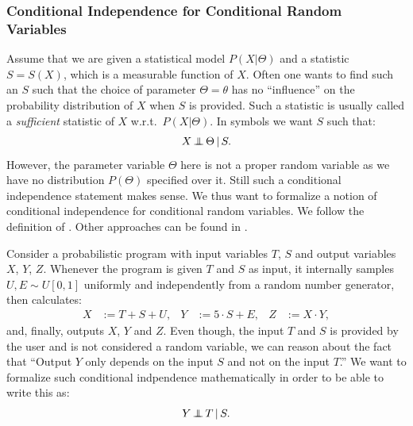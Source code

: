 \subsubsection{Conditional Independence for Conditional Random Variables}

\begin{Motivation}
    Assume that we are given a statistical model $P(X|\Theta)$ and a statistic $S=S(X)$, which is a measurable function of $X$.
    Often one wants to find such an $S$ such that the choice of parameter $\Theta=\theta$ has no ``influence'' on the probability distribution of $X$ when $S$ is provided. Such a statistic is usually called a \emph{sufficient} statistic of $X$ w.r.t.\ $P(X|\Theta)$. In symbols we want $S$ such that:
    \[ X \operatorname*{\perp\mkern-11mu\perp} \Theta \operatorname*{|} S.\]
    However, the parameter variable $\Theta$ here is not a proper random variable as we have no distribution $P(\Theta)$ specified over it. Still such a conditional independence statement makes sense. We thus want to formalize a notion of conditional independence for conditional random variables. We follow the definition of \cite{For21}.
    Other approaches can be found in \cite{Daw79, Daw80, Daw01, CD17, RERS17, FM20}.
\end{Motivation}

\begin{Motivation}
    Consider a probabilistic program with input variables $T$, $S$ and output variables $X$, $Y$, $Z$. 
    Whenever the program is given $T$ and $S$ as input, it internally samples $U,E \sim U[0,1]$ uniformly and independently from a random number generator,  then calculates:
    \begin{align*}
        X &:= T + S + U, & Y &:= 5 \cdot S + E, & Z&:= X \cdot Y,
    \end{align*}
    and, finally, outputs $X$, $Y$ and $Z$.
    Even though, the input $T$ and $S$ is provided by the user and is not considered a random variable, we can reason about the fact that 
    ``Output $Y$ only depends on the input $S$ and not on the input $T$.'' 
    We want to formalize such conditional indpendence mathematically in order to be able to write this as:
    \[ Y \operatorname*{\perp\mkern-11mu\perp} T \operatorname*{|} S.\]
\end{Motivation}

